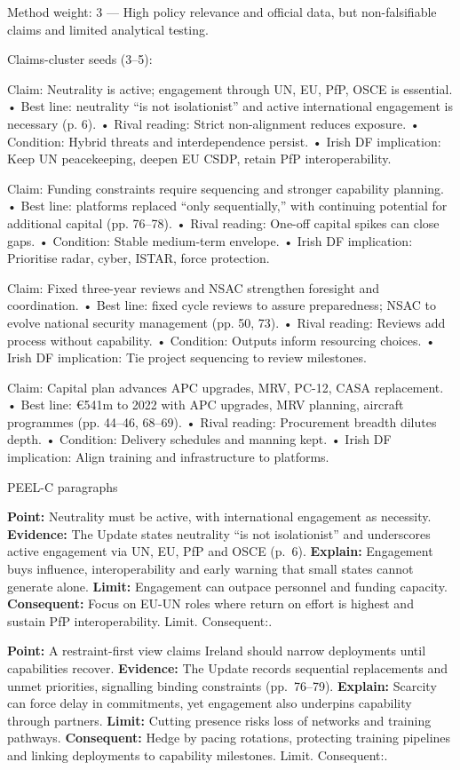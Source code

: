 Method weight: 3 — High policy relevance and official data, but non-falsifiable claims and limited analytical testing.

Claims-cluster seeds (3–5):

Claim: Neutrality is active; engagement through UN, EU, PfP, OSCE is essential.
• Best line: neutrality “is not isolationist” and active international engagement is necessary (p. 6).
• Rival reading: Strict non-alignment reduces exposure.
• Condition: Hybrid threats and interdependence persist.
• Irish DF implication: Keep UN peacekeeping, deepen EU CSDP, retain PfP interoperability.

Claim: Funding constraints require sequencing and stronger capability planning.
• Best line: platforms replaced “only sequentially,” with continuing potential for additional capital (pp. 76–78).
• Rival reading: One-off capital spikes can close gaps.
• Condition: Stable medium-term envelope.
• Irish DF implication: Prioritise radar, cyber, ISTAR, force protection.

Claim: Fixed three-year reviews and NSAC strengthen foresight and coordination.
• Best line: fixed cycle reviews to assure preparedness; NSAC to evolve national security management (pp. 50, 73).
• Rival reading: Reviews add process without capability.
• Condition: Outputs inform resourcing choices.
• Irish DF implication: Tie project sequencing to review milestones.

Claim: Capital plan advances APC upgrades, MRV, PC-12, CASA replacement.
• Best line: €541m to 2022 with APC upgrades, MRV planning, aircraft programmes (pp. 44–46, 68–69).
• Rival reading: Procurement breadth dilutes depth.
• Condition: Delivery schedules and manning kept.
• Irish DF implication: Align training and infrastructure to platforms.

PEEL-C paragraphs

\textbf{Point:} Neutrality must be active, with international engagement as necessity.
\textbf{Evidence:} The Update states neutrality “is not isolationist” and underscores active engagement via UN, EU, PfP and OSCE (p.~6).
\textbf{Explain:} Engagement buys influence, interoperability and early warning that small states cannot generate alone.
\textbf{Limit:} Engagement can outpace personnel and funding capacity.
\textbf{Consequent:} Focus on EU-UN roles where return on effort is highest and sustain PfP interoperability. Limit. Consequent:.

\textbf{Point:} A restraint-first view claims Ireland should narrow deployments until capabilities recover.
\textbf{Evidence:} The Update records sequential replacements and unmet priorities, signalling binding constraints (pp.~76–79).
\textbf{Explain:} Scarcity can force delay in commitments, yet engagement also underpins capability through partners.
\textbf{Limit:} Cutting presence risks loss of networks and training pathways.
\textbf{Consequent:} Hedge by pacing rotations, protecting training pipelines and linking deployments to capability milestones. Limit. Consequent:.


